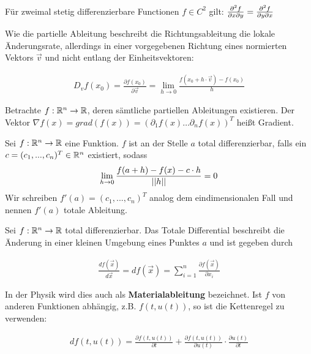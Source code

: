 \begin{satz}
	Für zweimal stetig differenzierbare Functionen $f \in C^2$ gilt: $\frac{\partial ^2f}{\partial x \partial y} = \frac{\partial ^2f}{\partial y \partial x}$
\end{satz}


\begin{definition}[Richtungsableitung]
	Wie die partielle Ableitung beschreibt die Richtungsableitung die lokale Änderungsrate, allerdings in einer vorgegebenen Richtung eines normierten Vektors $\vec{v}$ und nicht entlang der Einheitsvektoren:
	
	\begin{align*}
	D_v f(x_0) = \frac{\partial f(x_0)}{\partial \vec{v}} = \lim_{h \rightarrow 0} \frac{f(x_0  + h \cdot \vec{v}) - f(x_0)}{h}
	\end{align*}
\end{definition}


\begin{definition}[Gradient]
	 Betrachte $f : \mathbb{R}^n \rightarrow \mathbb{R}$, deren sämtliche partiellen Ableitungen existieren. 
	 Der Vektor $\nabla f(x) = grad(f(x)) = (\partial_1 f(x) \dots \partial_n f(x))^T$ heißt Gradient.
\end{definition}

\begin{definition}
	Sei $f : \mathbb{R}^n \rightarrow \mathbb{R}$ eine Funktion. $f$ ist an der Stelle $a$ total differenzierbar, falls ein $c = (c_1, ..., c_n)^T \in \mathbb{R}^n$ existiert, sodass
	\begin{align*}
		\lim_{h \rightarrow 0} \frac{f(a + h) - f(x) - c \cdot h}{||h||} = 0
	\end{align*}
	Wir schreiben $f'(a) = (c_1, ..., c_n)^T$ analog dem eindimensionalen Fall und nennen $f'(a)$ totale Ableitung. 	
\end{definition}

\begin{definition}
	Sei $f : \mathbb{R}^n \rightarrow \mathbb{R}$ total differenzierbar. Das Totale Differential beschreibt die Änderung in einer kleinen Umgebung eines Punktes $a$ und ist gegeben durch
	
	\begin{align*}
	\frac{d f (\vec{x}) }{d \vec{x}} = d f(\vec{x}) = \sum_{i = 1}^{n} \frac{\partial f (\vec{x}) }{\partial x_i}
	\end{align*}
	
	In der Physik wird dies auch als \textbf{Materialableitung} bezeichnet. Ist $f$ von anderen Funktionen abhängig, z.B. $f(t, u(t))$, so ist die Kettenregel zu verwenden:
	
	\begin{align*}
	d f(t, u(t))  = \frac{\partial f (t, u(t))}{\partial t} + \frac{\partial f (t, u(t))}{\partial u(t)} \cdot \frac{\partial u (t)}{\partial t}
	\end{align*}
	
\end{definition}

